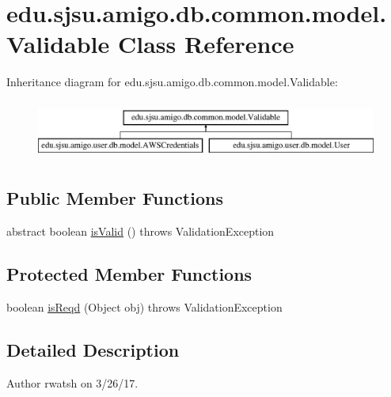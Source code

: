 \hypertarget{classedu_1_1sjsu_1_1amigo_1_1db_1_1common_1_1model_1_1_validable}{}\section{edu.\+sjsu.\+amigo.\+db.\+common.\+model.\+Validable Class Reference}
\label{classedu_1_1sjsu_1_1amigo_1_1db_1_1common_1_1model_1_1_validable}
Inheritance diagram for edu.\+sjsu.\+amigo.\+db.\+common.\+model.\+Validable\+:\begin{figure}[H]
\begin{center}
\leavevmode
\includegraphics[height=1.971831cm]{classedu_1_1sjsu_1_1amigo_1_1db_1_1common_1_1model_1_1_validable}
\end{center}
\end{figure}
\subsection*{Public Member Functions}
\begin{DoxyCompactItemize}
\item 
abstract boolean \hyperlink{classedu_1_1sjsu_1_1amigo_1_1db_1_1common_1_1model_1_1_validable_af1ff212bfc820b4fc62de1be676ef018}{is\+Valid} ()  throws Validation\+Exception
\end{DoxyCompactItemize}
\subsection*{Protected Member Functions}
\begin{DoxyCompactItemize}
\item 
boolean \hyperlink{classedu_1_1sjsu_1_1amigo_1_1db_1_1common_1_1model_1_1_validable_ab9527f96d7d64d5eda700827967002c0}{is\+Reqd} (Object obj)  throws Validation\+Exception 
\end{DoxyCompactItemize}


\subsection{Detailed Description}
\begin{DoxyAuthor}{Author}
rwatsh on 3/26/17. 
\end{DoxyAuthor}


